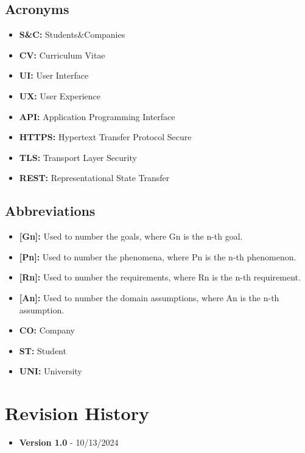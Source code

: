 \subsection{Acronyms}\label{subsec:acronyms}
\begin{itemize}
    \item \textbf{S\&C:} Students\&Companies
    \item \textbf{CV:} Curriculum Vitae
    \item \textbf{UI:} User Interface
    \item \textbf{UX:} User Experience
    \item \textbf{API:} Application Programming Interface
    \item \textbf{HTTPS:} Hypertext Transfer Protocol Secure
    \item \textbf{TLS:} Transport Layer Security
    \item \textbf{REST:} Representational State Transfer

\end{itemize}

\subsection{Abbreviations}\label{subsec:abbreviations}
\begin{itemize}
    \item \textbf{[Gn]:} Used to number the goals, where Gn is the n-th goal.
    \item \textbf{[Pn]:} Used to number the phenomena, where Pn is the n-th phenomenon.
    \item \textbf{[Rn]:} Used to number the requirements, where Rn is the n-th requirement.
    \item \textbf{[An]:} Used to number the domain assumptions, where An is the n-th assumption.
    \item \textbf{CO:} Company
    \item \textbf{ST:} Student
    \item \textbf{UNI:} University
\end{itemize}

\section{Revision History}\label{sec:revisionhistory}
\begin{itemize}
    \item \textbf{Version 1.0} - 10/13/2024
\end{itemize}

